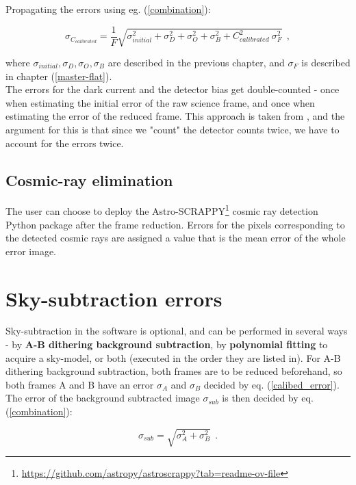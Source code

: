 \documentclass{article}
\begin{document}
Propagating the errors using eg. (\ref{combination}): 

\begin{equation}\label{calibed_error}
    \sigma_{C_{calibrated}} = \frac{1}{F} \sqrt{\sigma_{initial}^2 + \sigma_{D}^2 + \sigma_{O}^2 + \sigma_{B}^2 +  C_{calibrated}^2 \ \sigma_{F}^2} \ \ ,
\end{equation}

\noindent where $\sigma_{initial}, \sigma_{D}, \sigma_{O}, \sigma_{B}$ are described in the previous chapter, and $\sigma_{F}$ is described in chapter (\ref{master-flat}).\\

\noindent The errors for the dark current and the detector bias get double-counted  - once when estimating the initial error of the raw science frame, and once when estimating the error of the reduced frame. This approach is taken from \cite[p. 45-47]{handbook}, and the argument for this is that since we "count" the detector counts twice, we have to account for the errors twice.

\subsection{Cosmic-ray elimination}

The user can choose to deploy the Astro-SCRAPPY\footnote{\url{https://github.com/astropy/astroscrappy?tab=readme-ov-file}} cosmic ray detection Python package \cite{cr_2, cr_1} after the frame reduction. Errors for the pixels corresponding to the detected cosmic rays are assigned a value that is the mean error of the whole error image.

\section{Sky-subtraction errors}

Sky-subtraction in the software is optional, and can be performed in several ways - by \textbf{A-B dithering background subtraction}, by \textbf{polynomial fitting} to acquire a sky-model, or both (executed in the order they are listed in). For A-B dithering background subtraction, both frames are to be reduced beforehand, so both frames A and B have an error $\sigma_{A}$ and $\sigma_{B}$ decided by eq. (\ref{calibed_error}). The error of the background subtracted image $\sigma_{sub}$ is then decided by eq. (\ref{combination}):

\begin{equation}\label{AB error}
    \sigma_{sub} = \sqrt{\sigma_{A}^2 + \sigma_{B}^2} \ \ .
\end{equation}
\end{document}
